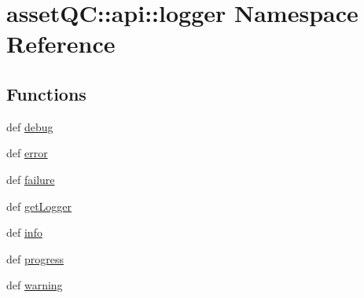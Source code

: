 \hypertarget{namespaceassetQC_1_1api_1_1logger}{\section{asset\-Q\-C\-:\-:api\-:\-:logger \-Namespace \-Reference}
\label{dd/d37/namespaceassetQC_1_1api_1_1logger}
}
\subsection*{\-Functions}
\begin{DoxyCompactItemize}
\item 
def \hyperlink{namespaceassetQC_1_1api_1_1logger_a178dec6584c38ab81565144a1637a9e4}{debug}
\item 
def \hyperlink{namespaceassetQC_1_1api_1_1logger_ae5f3f0a3927681ff35cfe395c0772de7}{error}
\item 
def \hyperlink{namespaceassetQC_1_1api_1_1logger_af0e67936344658e1c4d5409c72f51e87}{failure}
\item 
def \hyperlink{namespaceassetQC_1_1api_1_1logger_ab9b6d4be6955985e33716104224c8ba3}{get\-Logger}
\item 
def \hyperlink{namespaceassetQC_1_1api_1_1logger_a3f30c3392549c548b7461aa175e03cf7}{info}
\item 
def \hyperlink{namespaceassetQC_1_1api_1_1logger_aa8ac771f9cd69fd8ee9d06458361894c}{progress}
\item 
def \hyperlink{namespaceassetQC_1_1api_1_1logger_a029dca46a4eb1fb644df4d2e077b2ab8}{warning}
\end{DoxyCompactItemize}
